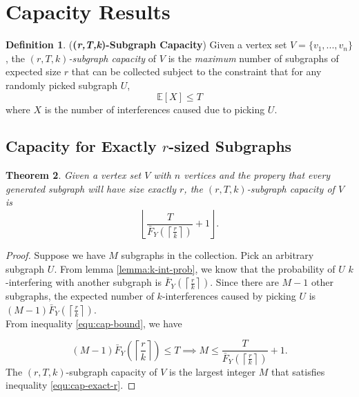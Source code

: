 \documentclass[10pt]{extarticle}
\newcommand{\E}{\mathbb{E}}
\newtheorem{theorem}{Theorem}
\theoremstyle{definition}
\newtheorem{definition}[theorem]{Definition}
\begin{document}
\section{Capacity Results}

\begin{definition} (\textbf{(\textit{r,T,k})-Subgraph Capacity}) Given a vertex set $V = \{v_1,...,v_n\}$, the \textit{$(r,T,k)$-subgraph capacity} of $V$ is the \textit{maximum} number of subgraphs of expected size $r$ that can be collected subject to the constraint that for any randomly picked subgraph $U$, 
\begin{equation}
\label{equ:cap-bound}
    \E[X] \le T
\end{equation}
where $X$ is the number of interferences caused due to picking $U$. 
\end{definition}

\subsection{Capacity for Exactly $r$-sized Subgraphs}

\begin{theorem}
    Given a vertex set $V$ with $n$ vertices and the propery that every generated subgraph will have size exactly $r$, the $(r,T,k)$-subgraph capacity of $V$ is 
    \begin{equation*}
        \left\lfloor \frac{T}{\bar{F}_Y\left(\left\lceil \frac{r}{k} \right\rceil\right)} + 1 \right\rfloor.
    \end{equation*}
\end{theorem}

\begin{proof}
    Suppose we have $M$ subgraphs in the collection. Pick an arbitrary subgraph $U$. From lemma \ref{lemma:k-int-prob}, we know that the probability of $U$ $k$-interfering with another subgraph is $\bar{F}_Y\left(\left\lceil \frac{r}{k} \right\rceil\right)$. Since there are $M-1$ other subgraphs, the expected number of $k$-interferences caused by picking $U$ is $(M-1) \bar{F}_Y\left(\left\lceil \frac{r}{k} \right\rceil\right)$. \\

\noindent From inequality \ref{equ:cap-bound}, we have 

    \begin{equation}
    \label{equ:cap-exact-r}
        (M-1) \bar{F}_Y\left(\left\lceil \frac{r}{k} \right\rceil\right) \le T \implies M \le \frac{T}{\bar{F}_Y\left(\left\lceil \frac{r}{k} \right\rceil\right)} + 1.
    \end{equation}
    The $(r,T,k)$-subgraph capacity of $V$ is the largest integer $M$ that satisfies inequality \ref{equ:cap-exact-r}.
\end{proof}
\end{document}
